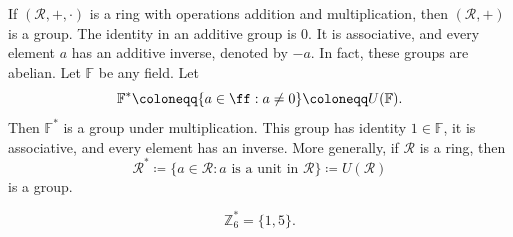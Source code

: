 If $(\mathcal{R},+,\cdot)$ is a ring with operations addition and multiplication, then $(\mathcal{R},+)$ is a group.
The identity in an additive group is $0$.
It is associative, and every element $a$ has an additive inverse, denoted by $-a$.
In fact, these groups are abelian.
Let $\mathbb{F}$ be any field.
Let
\[
    \mathbb{F}^* \coloneqq \{a\in \ff : a\neq 0\} \coloneqq U(\mathbb{F}).
\]
Then $\mathbb{F}^*$ is a group under multiplication.
This group has identity $1\in \mathbb{F}$, it is associative, and every element has an inverse.
More generally, if $\mathcal{R}$ is a ring, then
\[
    \mathcal{R}^* \coloneqq \{a\in \mathcal{R} : \text{$a$ is a unit in }\mathcal{R}\} \coloneqq U(\mathcal{R})
\]
is a group.

\begin{example}
    \[
        \mathbb{Z}_6^* = \{1,5\}.
    \]
\end{example}

